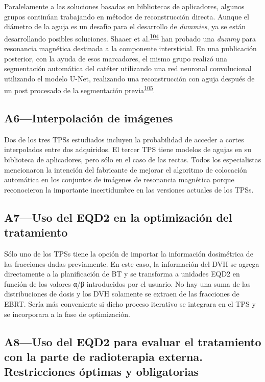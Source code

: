 \documentclass[
  a4paper,
]{scrreprt}
\begin{document}
Paralelamente a las soluciones basadas en bibliotecas de aplicadores,
algunos grupos continúan trabajando en métodos de reconstrucción
directa. Aunque el diámetro de la aguja es un desafío para el desarrollo
de \emph{dummies}, ya se están desarrollando posibles soluciones. Shaaer
et al.\textsuperscript{\protect\hyperlink{ref-shaaer2020}{104}} han
probado una \emph{dummy} para resonancia magnética destinada a la
componente intersticial. En una publicación posterior, con la ayuda de
esos marcadores, el mismo grupo realizó una segmentación automática del
catéter utilizando una red neuronal convolucional utilizando el modelo
U-Net, realizando una reconstrucción con aguja después de un post
procesado de la segmentación
previa\textsuperscript{\protect\hyperlink{ref-shaaer2021}{105}}.

\hypertarget{sec-a6}{%
\subsection{A6---Interpolación de imágenes}\label{sec-a6}}

Dos de los tres TPSs estudiados incluyen la probabilidad de acceder a
cortes interpolados entre dos adquiridos. El tercer TPS tiene modelos de
agujas en su biblioteca de aplicadores, pero sólo en el caso de las
rectas. Todos los especialistas mencionaron la intención del fabricante
de mejorar el algoritmo de colocación automática en los conjuntos de
imágenes de resonancia magnética porque reconocieron la importante
incertidumbre en las versiones actuales de los TPSs.

\hypertarget{sec-a7}{%
\subsection{A7---Uso del EQD2 en la optimización del
tratamiento}\label{sec-a7}}

Sólo uno de los TPSs tiene la opción de importar la información
dosimétrica de las fracciones dadas previamente. En este caso, la
información del DVH se agrega directamente a la planificación de BT y se
transforma a unidades EQD2 en función de los valores α/β introducidos
por el usuario. No hay una suma de las distribuciones de dosis y los DVH
solamente se extraen de las fracciones de EBRT. Sería más conveniente si
dicho proceso iterativo se integrara en el TPS y se incorporara a la
fase de optimización.

\hypertarget{sec-a8}{%
\subsection{A8---Uso del EQD2 para evaluar el tratamiento con la parte
de radioterapia externa. Restricciones óptimas y
obligatorias}\label{sec-a8}}
\end{document}
